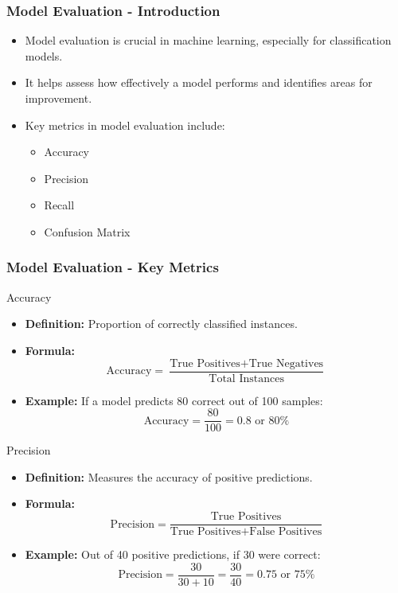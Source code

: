 \documentclass[aspectratio=169]{beamer}
\begin{document}
\begin{frame}[fragile]
    \frametitle{Model Evaluation - Introduction}
    \begin{itemize}
        \item Model evaluation is crucial in machine learning, especially for classification models.
        \item It helps assess how effectively a model performs and identifies areas for improvement.
        \item Key metrics in model evaluation include:
        \begin{itemize}
            \item Accuracy
            \item Precision
            \item Recall
            \item Confusion Matrix
        \end{itemize}
    \end{itemize}
\end{frame}

\begin{frame}[fragile]
    \frametitle{Model Evaluation - Key Metrics}
    \begin{block}{Accuracy}
        \begin{itemize}
            \item \textbf{Definition:} Proportion of correctly classified instances.
            \item \textbf{Formula:}
            \[
            \text{Accuracy} = \frac{\text{True Positives} + \text{True Negatives}}{\text{Total Instances}}
            \]
            \item \textbf{Example:} If a model predicts 80 correct out of 100 samples:
            \[
            \text{Accuracy} = \frac{80}{100} = 0.8 \text{ or } 80\%
            \]
        \end{itemize}
    \end{block}

    \begin{block}{Precision}
        \begin{itemize}
            \item \textbf{Definition:} Measures the accuracy of positive predictions.
            \item \textbf{Formula:}
            \[
            \text{Precision} = \frac{\text{True Positives}}{\text{True Positives} + \text{False Positives}}
            \]
            \item \textbf{Example:} Out of 40 positive predictions, if 30 were correct:
            \[
            \text{Precision} = \frac{30}{30 + 10} = \frac{30}{40} = 0.75 \text{ or } 75\%
            \]
        \end{itemize}
    \end{block}
\end{frame}
\end{document}
